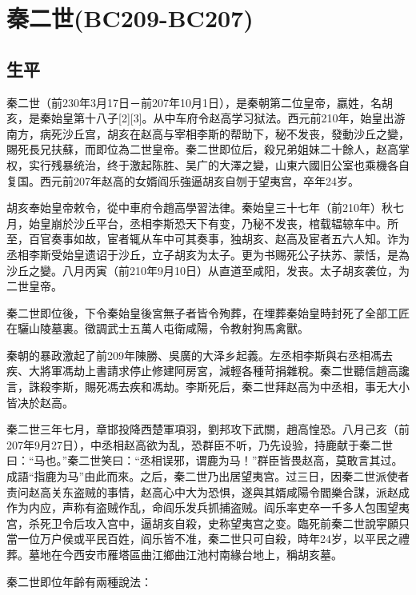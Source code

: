 
\section{秦二世\tiny(BC209-BC207)}

\subsection{生平}


秦二世（前230年3月17日－前207年10月1日），是秦朝第二位皇帝，嬴姓，名胡亥，是秦始皇第十八子[2][3]。从中车府令赵高学习狱法。西元前210年，始皇出游南方，病死沙丘宫，胡亥在赵高与宰相李斯的帮助下，秘不发丧，發動沙丘之變，賜死長兄扶蘇，而即位為二世皇帝。秦二世即位后，殺兄弟姐妹二十餘人，赵高掌权，实行残暴统治，终于激起陈胜、吴广的大澤之變，山東六國旧公室也乘機各自复国。西元前207年赵高的女婿阎乐強逼胡亥自刎于望夷宫，卒年24岁。

胡亥奉始皇帝敕令，從中車府令趙高學習法律。秦始皇三十七年（前210年）秋七月，始皇崩於沙丘平台，丞相李斯恐天下有变，乃秘不发丧，棺载辒辌车中。所至，百官奏事如故，宦者辄从车中可其奏事，独胡亥、赵高及宦者五六人知。诈为丞相李斯受始皇遗诏于沙丘，立子胡亥为太子。更为书赐死公子扶苏、蒙恬，是為沙丘之變。八月丙寅（前210年9月10日）从直道至咸阳，发丧。太子胡亥袭位，为二世皇帝。

秦二世即位後，下令秦始皇後宮無子者皆令殉葬，在埋葬秦始皇時封死了全部工匠在驪山陵墓裏。徵調武士五萬人屯衛咸陽，令教射狗馬禽獸。

秦朝的暴政激起了前209年陳勝、吳廣的大泽乡起義。左丞相李斯與右丞相馮去疾、大將軍馮劫上書請求停止修建阿房宮，減輕各種苛捐雜稅。秦二世聽信趙高讒言，誅殺李斯，賜死馮去疾和馮劫。李斯死后，秦二世拜赵高为中丞相，事无大小皆决於赵高。

秦二世三年七月，章邯投降西楚軍項羽，劉邦攻下武關，趙高惶恐。八月己亥（前207年9月27日），中丞相赵高欲为乱，恐群臣不听，乃先设验，持鹿献于秦二世曰：“马也。”秦二世笑曰：“丞相误邪，谓鹿为马！”群臣皆畏赵高，莫敢言其过。成語“指鹿为马”由此而來。之后，秦二世乃出居望夷宫。过三日，因秦二世派使者责问赵高关东盗贼的事情，赵高心中大为恐惧，遂與其婿咸陽令閻樂合謀，派赵成作为内应，声称有盗贼作乱，命阎乐发兵抓捕盗贼。阎乐率吏卒一千多人包围望夷宫，杀死卫令后攻入宫中，逼胡亥自殺，史称望夷宫之变。臨死前秦二世說寜願只當一位万户侯或平民百姓，阎乐皆不准，秦二世只可自殺，時年24岁，以平民之禮葬。墓地在今西安市雁塔區曲江鄉曲江池村南緣台地上，稱胡亥墓。


秦二世即位年齡有兩種說法：


